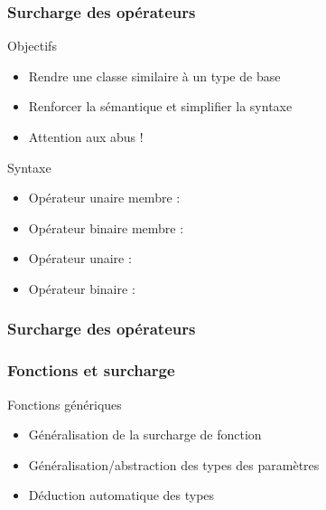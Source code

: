 \documentclass[svgnames]{beamer}
\begin{document}
\begin{frame}
  \frametitle{Surcharge des opérateurs}
  \begin{block}{Objectifs}
  \begin{itemize}
  \item Rendre une classe similaire à un type de base
  \item Renforcer la sémantique et simplifier la syntaxe
  \item Attention aux abus !
  \end{itemize}
  \end{block}

  \begin{block}{Syntaxe}
  \begin{itemize}
  \item Opérateur unaire membre : 
  \item Opérateur binaire membre : 
  \item Opérateur unaire : 
  \item Opérateur binaire : 
  \end{itemize}
  \end{block}
\end{frame}

\begin{frame}
  \frametitle{Surcharge des opérateurs}
\end{frame}

\begin{frame}
  \frametitle{Fonctions et surcharge}
  \begin{block}{Fonctions génériques}
  \begin{itemize}
  \item Généralisation de la surcharge de fonction
  \item Généralisation/abstraction des types des paramètres
  \item Déduction automatique des types
  \end{itemize}

  \end{block}
\end{frame}
\end{document}

